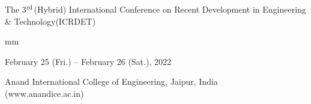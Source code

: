\documentclass[twoside,11pt]{amsart}
\begin{document}

\vspace*{25mm}

{\Huge
\begin{center}
The 3${}^{\rm rd}$(Hybrid) International Conference on Recent Development in Engineering \& Technology(ICRDET)

\end{center}
}
 mm


{\Large
\begin{center}
February 25 (Fri.) -- February 26 (Sat.), 2022

Anand International College of Engineering, Jaipur, India\\
(www.anandice.ac.in)
\end{center}
}


\thispagestyle{empty}

\newpage
\end{document}
